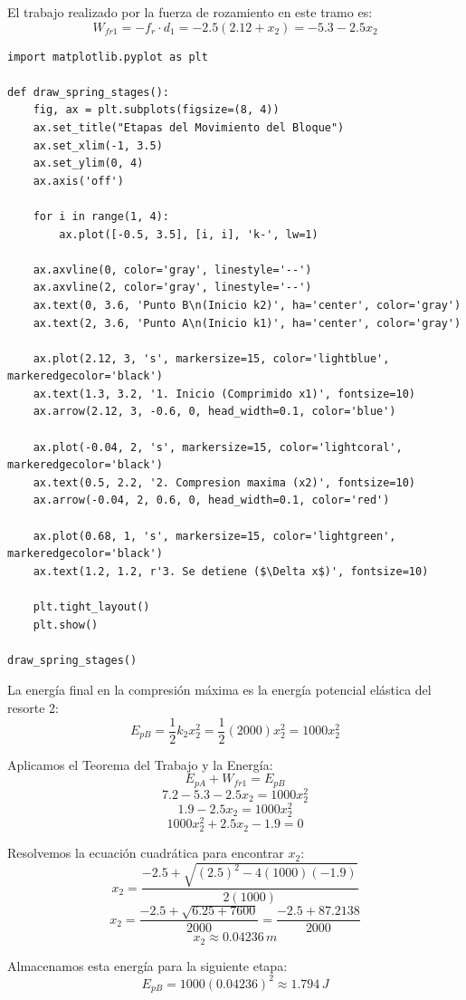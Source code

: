 \documentclass[12pt, a4paper]{article}
\begin{document}
El trabajo realizado por la fuerza de rozamiento en este tramo es:
$$ W_{fr1} = -f_r \cdot d_1 = -2.5 (2.12 + x_2) = -5.3 - 2.5x_2 $$

\begin{lstlisting}
import matplotlib.pyplot as plt

def draw_spring_stages():
    fig, ax = plt.subplots(figsize=(8, 4))
    ax.set_title("Etapas del Movimiento del Bloque")
    ax.set_xlim(-1, 3.5)
    ax.set_ylim(0, 4)
    ax.axis('off')
    
    for i in range(1, 4):
        ax.plot([-0.5, 3.5], [i, i], 'k-', lw=1)
        
    ax.axvline(0, color='gray', linestyle='--')
    ax.axvline(2, color='gray', linestyle='--')
    ax.text(0, 3.6, 'Punto B\n(Inicio k2)', ha='center', color='gray')
    ax.text(2, 3.6, 'Punto A\n(Inicio k1)', ha='center', color='gray')
    
    ax.plot(2.12, 3, 's', markersize=15, color='lightblue', markeredgecolor='black')
    ax.text(1.3, 3.2, '1. Inicio (Comprimido x1)', fontsize=10)
    ax.arrow(2.12, 3, -0.6, 0, head_width=0.1, color='blue')
    
    ax.plot(-0.04, 2, 's', markersize=15, color='lightcoral', markeredgecolor='black')
    ax.text(0.5, 2.2, '2. Compresion maxima (x2)', fontsize=10)
    ax.arrow(-0.04, 2, 0.6, 0, head_width=0.1, color='red')
    
    ax.plot(0.68, 1, 's', markersize=15, color='lightgreen', markeredgecolor='black')
    ax.text(1.2, 1.2, r'3. Se detiene ($\Delta x$)', fontsize=10)
    
    plt.tight_layout()
    plt.show()

draw_spring_stages()
\end{lstlisting}

La energía final en la compresión máxima es la energía potencial elástica del resorte 2:
$$ E_{pB} = \frac{1}{2} k_2 x_2^2 = \frac{1}{2} (2000) x_2^2 = 1000x_2^2 $$

Aplicamos el Teorema del Trabajo y la Energía:
$$ E_{pA} + W_{fr1} = E_{pB} $$
$$ 7.2 - 5.3 - 2.5x_2 = 1000x_2^2 $$
$$ 1.9 - 2.5x_2 = 1000x_2^2 $$
$$ 1000x_2^2 + 2.5x_2 - 1.9 = 0 $$

Resolvemos la ecuación cuadrática para encontrar $x_2$:
$$ x_2 = \frac{-2.5 + \sqrt{(2.5)^2 - 4(1000)(-1.9)}}{2(1000)} $$
$$ x_2 = \frac{-2.5 + \sqrt{6.25 + 7600}}{2000} = \frac{-2.5 + 87.2138}{2000} $$
$$ x_2 \approx 0.04236 \, \si{m} $$

Almacenamos esta energía para la siguiente etapa:
$$ E_{pB} = 1000(0.04236)^2 \approx 1.794 \, \si{J} $$
\end{document}
